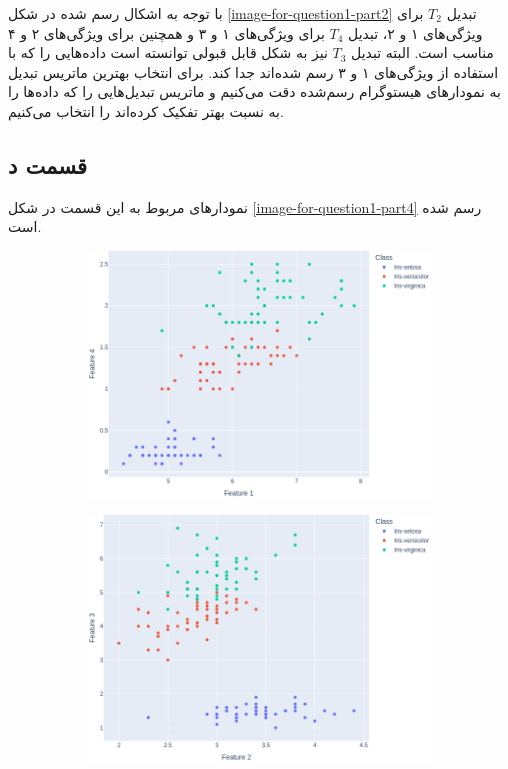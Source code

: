 \documentclass[14pt,a4]{article}
\begin{document}
با توجه به اشکال رسم شده در شکل \ref{image-for-question1-part2} تبدیل‌ $T_2$ برای ویژگی‌های ۱ و ۲،
تبدیل $T_4$ برای ویژگی‌های ۱ و ۳ و همچنین برای ویژگی‌های ۲ و ۴ مناسب است. البته تبدیل
$T_3$ نیز به شکل قابل قبولی توانسته است داده‌هایی را که با استفاده از ویژگی‌های
۱ و ۳ رسم شده‌اند جدا کند. برای انتخاب بهترین ماتریس تبدیل به نمودار‌های
هیستوگرام رسم‌شده دقت می‌کنیم و ماتریس تبدیل‌هایی را که داده‌ها را به نسبت بهتر تفکیک کرده‌اند را
انتخاب می‌کنیم.

\subsection*{قسمت د}

نمودار‌های مربوط به این قسمت در شکل \ref{image-for-question1-part4} رسم شده است.

\begin{figure}[h]
    \centering
    \begin{subfigure}{0.32\linewidth}
        \centering
        \includegraphics[width=\linewidth]{images/q3/p4/14.png}
    \end{subfigure}
    \hfill
    \begin{subfigure}{0.32\linewidth}
        \centering
        \includegraphics[width=\linewidth]{images/q3/p4/23.png}

\end{subfigure}
\end{figure}
\end{document}
